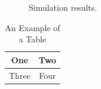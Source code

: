 \documentclass[12pt,journal,compsoc]{IEEEtran}
\begin{document}
\begin{figure}[!t]
\centering
{}
\hfil
{}
\hfil
{}
\caption{Simulation results.}
\label{fig_sim}
\end{figure}
%


\begin{table}[!t]
\renewcommand{\arraystretch}{1.3}
\caption{An Example of a Table}
\label{table_example}
\centering
\begin{tabular}{|c||c|}
\hline
One & Two\\
\hline
Three & Four\\
\hline
\end{tabular}
\end{table}
\end{document}
